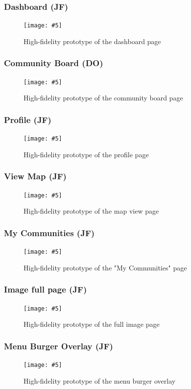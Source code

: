 \documentclass[a4paper,12pt]{article}
\newcommand{\includescalefigure}[5]{
\begin{figure}[H]
\centering
\texttt{[image: \#5]}
\captionsetup{width=.8\linewidth} 
\caption[#2]{#3}
\label{#1}
\end{figure}
}
\begin{document}
\subsubsection{Dashboard (JF)}
\includescalefigure{fig:hf_dash}{Dashboard High-fidelity Prototype}{High-fidelity prototype of the dashboard page}{0.25}{"figma/Dashboard PageHF.PNG"}

\subsubsection{Community Board (DO)}
\includescalefigure{fig:hf_comm_board}{Community Board High-fidelity Prototype}{High-fidelity prototype of the community board page}{0.25}{"figma/Community Board PageHF.PNG"}

\subsubsection{Profile (JF)}
\includescalefigure{fig:hf_profile}{Profile High-fidelity Prototype}{High-fidelity prototype of the profile page}{0.5}{"figma/Profile PageHF.PNG"}

\subsubsection{View Map (JF)}
\includescalefigure{fig:hf_view_map}{Map View High-fidelity Prototype}{High-fidelity prototype of the map view page}{0.4}{"figma/View MapHF.PNG"}
\subsubsection{My Communities (JF)}
\includescalefigure{fig:hf_my_comm}{My Communities High-fidelity Prototype}{High-fidelity prototype of the "My Communities" page}{0.5}{"figma/My Communities PageHF.PNG"}

\subsubsection{Image full page (JF)}
\includescalefigure{fig:hf_full_image}{Full Image High-fidelity Prototype}{High-fidelity prototype of the full image page}{0.5}{"figma/Full Image PageHF.PNG"}
\subsubsection{Menu Burger Overlay (JF)}
\includescalefigure{fig:hf_menu}{Menu Burger Overlay High-fidelity Prototype}{High-fidelity prototype of the menu burger overlay}{0.25}{"figma/Menu Burger Overlay - Community BoardHF.PNG"}
\end{document}
